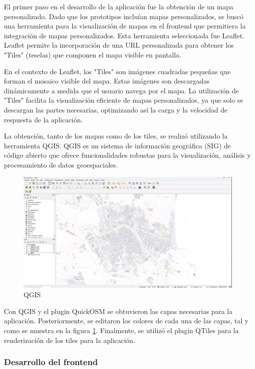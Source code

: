 \documentclass{article}
\begin{document}
El primer paso en el desarrollo de la aplicación fue la obtención de un mapa personalizado. Dado que los prototipos incluían mapas personalizados, se buscó una herramienta para la visualización de mapas en el frontend que permitiera la integración de mapas personalizados. Esta herramienta seleccionada fue Leaflet. Leaflet permite la incorporación de una URL personalizada para obtener los "Tiles" (teselas) que componen el mapa visible en pantalla.

En el contexto de Leaflet, los "Tiles" son imágenes cuadradas pequeñas que forman el mosaico visible del mapa. Estas imágenes son descargadas dinámicamente a medida que el usuario navega por el mapa. La utilización de "Tiles" facilita la visualización eficiente de mapas personalizados, ya que solo se descargan las partes necesarias, optimizando así la carga y la velocidad de respuesta de la aplicación. 

La obtención, tanto de los mapas como de los tiles, se realizó utilizando la herramienta QGIS. QGIS es un sistema de información geográfica (SIG) de código abierto que ofrece funcionalidades robustas para la visualización, análisis y procesamiento de datos geoespaciales.

\begin{figure}[H]
    \center
    \includegraphics[width=14cm]{images/qgis.png}
    \caption{QGIS}
    \label{fig:qgis}
\end{figure}

Con QGIS y el plugin QuickOSM se obtuvieron las capas necesarias para la aplicación. Posteriormente, se editaron los colores de cada una de las capas, tal y como se muestra en la figura \ref{fig:qgis}. Finalmente, se utilizó el plugin QTiles para la renderización de los tiles para la aplicación.

\subsubsection{Desarrollo del frontend}
\end{document}
